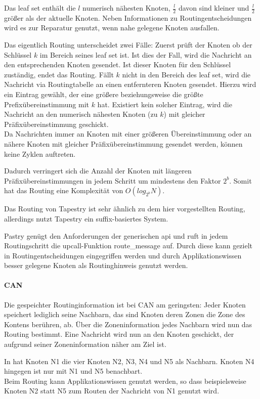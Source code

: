 Das leaf set enthält die $l$ numerisch nähesten Knoten, $\frac{l}{2}$ davon sind kleiner und $\frac{l}{2}$ größer als der aktuelle Knoten. Neben Informationen zu Routingentscheidungen wird es zur Reparatur genutzt, wenn nahe gelegene Knoten ausfallen.

Das eigentlich Routing unterscheidet zwei Fälle: Zuerst prüft der Knoten ob der Schlüssel $k$ im Bereich seines leaf set ist. Ist dies der Fall, wird die Nachricht an den entsprechenden Knoten gesendet. Ist dieser Knoten für den Schlüssel zuständig, endet das Routing. Fällt $k$ nicht in den Bereich des leaf set, wird die Nachricht via Routingtabelle an einen entfernteren Knoten gesendet. Hierzu wird ein Eintrag gewählt, der eine größere beziehungsweise die größte Prefixübereinstimmung mit $k$ hat. Existiert kein solcher Eintrag, wird die Nachricht an den numerisch nähesten Knoten (zu $k$) mit gleicher Präfixübereinstimmung geschickt.\\
Da Nachrichten immer an Knoten mit einer größeren Übereinstimmung oder an nähere Knoten mit gleicher Präfixübereinstimmung gesendet werden, können keine Zyklen auftreten.

Dadurch verringert sich die Anzahl der Knoten mit längeren Präfixübereinstimmungen in jedem Schritt um mindestens den Faktor $2^b$. Somit hat das Routing eine Komplexität von $O(log_{2^b} N)$.

Das Routing von Tapestry ist sehr ähnlich zu dem hier vorgestellten Routing, allerdings nutzt Tapestry ein suffix-basiertes System.

Pastry genügt den Anforderungen der generischen \ac{api} und ruft in jedem Routingschritt die upcall-Funktion route\_message auf. Durch diese kann gezielt in Routingentscheidungen eingegriffen werden und durch Applikationswissen besser gelegene Knoten als Routinghinweis genutzt werden.

\paragraph{CAN} 
Die gespeichter Routinginformation ist bei CAN am geringsten: Jeder Knoten speichert lediglich seine Nachbarn, das sind Knoten deren Zonen die Zone des Kontens berühren, ab. Über die Zoneninformation jedes Nachbarn wird nun das Routing bestimmt. Eine Nachricht wird nun an den Knoten geschickt, der aufgrund seiner Zoneninformation näher am Ziel ist.

In  hat Knoten N1 die vier Knoten N2, N3, N4 und N5 als Nachbarn. Knoten N4 hingegen ist nur mit N1 und N5 benachbart.\\
Beim Routing kann Applikationswissen genutzt werden, so dass beispielsweise Knoten N2 statt N5 zum Routen der Nachricht von N1 genutzt wird. 

